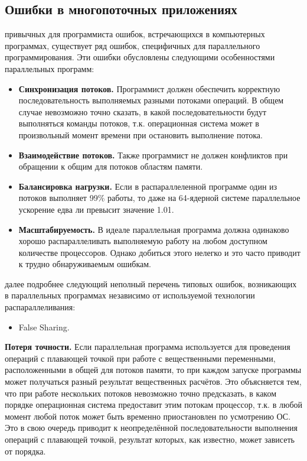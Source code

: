 { %
	\subsection{Ошибки в многопоточных приложениях}
	 привычных для программиста ошибок, встречающихся в компьютерных программах, существует ряд ошибок, специфичных для параллельного программирования. Эти ошибки обусловлены следующими особенностями параллельных программ: 
	\begin{itemize}
		\item\textbf{Синхронизация потоков.} Программист должен обеспечить корректную последовательность выполняемых разными потоками операций. В общем случае невозможно точно сказать, в какой последовательности будут выполняться команды потоков, т.к. операционная система может в произвольный момент времени при остановить выполнение потока.
		\item\textbf{Взаимодействие потоков.} Также программист не должен конфликтов при обращении к общим для потоков областям памяти. 
		\item\textbf{Балансировка нагрузки.} Если в распараллеленной программе один из потоков выполняет 99\% работы, то даже на 64-ядерной системе параллельное ускорение едва ли превысит значение 1.01.
		\item\textbf{Масштабируемость.} В идеале параллельная программа должна одинаково хорошо распараллеливать выполняемую работу на любом доступном количестве процессоров. Однако добиться этого нелегко и это часто приводит к трудно обнаруживаемым ошибкам.
	\end{itemize}
	 далее подробнее следующий неполный перечень типовых ошибок, возникающих в параллельных программах независимо от используемой технологии распараллеливания:
	\begin{itemize}
		 точности операций с плавающей точкой.
		 блокировки (deadlock).
		 гонки (race conditions). 
		 АВА.
		 приоритетов.
		(starvation).
		\item False Sharing.
	\end{itemize}
	\par\textbf{Потеря точности.} Если параллельная программа используется для проведения операций с плавающей точкой при работе с вещественными  переменными, расположенными в общей для потоков памяти, то при каждом запуске программы может получаться разный результат вещественных расчётов. Это объясняется тем, что при работе нескольких потоков невозможно точно предсказать, в каком порядке операционная система предоставит этим потокам процессор, т.к. в любой момент любой поток может быть временно приостановлен по усмотрению ОС. Это в свою очередь приводит к неопределённой последовательности выполнения операций с плавающей точкой, результат которых, как известно, может зависеть от порядка.
}
